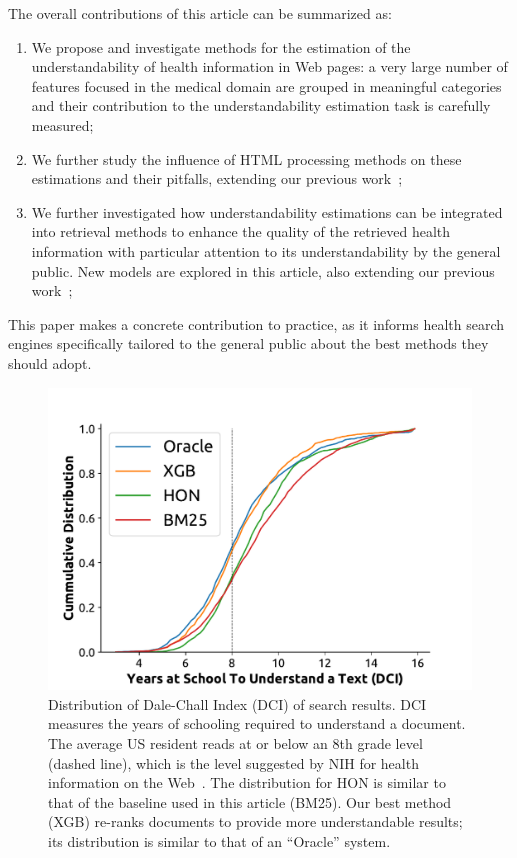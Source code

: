 The overall contributions of this article can be summarized as:
\begin{enumerate}
\item We propose and investigate methods for the estimation of the understandability of health information in Web pages: a very large number of features focused in the medical domain are grouped in meaningful categories and their contribution to the understandability estimation task is carefully measured;
\item We further study the influence of HTML processing methods on these estimations and their pitfalls, extending our previous work~\cite{palotti15};
\item We further investigated how understandability estimations can be integrated into retrieval methods to enhance the quality of the retrieved health information with particular attention to its understandability by the general public. New models are explored in this article, also extending our previous work~\cite{palotti2016ranking};
\end{enumerate}

This paper makes a concrete contribution to practice, as it informs health search engines specifically tailored to the general public about the best methods they should adopt. 

\begin{figure}[t!]
   \centering
   \includegraphics[width=.51\textwidth]{graphics/cumdist}
    \caption{Distribution of Dale-Chall Index (DCI) of search results. DCI measures the years of schooling required to understand a document. The average US resident reads at or below an 8th grade level (dashed line)\cite{cowan04,wallace04,davis04,stossel12}, which is the level suggested by NIH for health information on the Web~\cite{clear94}. The distribution for HON is similar to that of the baseline used in this article (BM25). Our best method (XGB) re-ranks documents to provide more understandable results; its distribution is similar to that of an ``Oracle'' system.}
   \label{fig:dist}
\end{figure}


